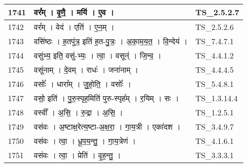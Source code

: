 \documentclass[17pt]{extarticle}
\begin{document}
\begin{longtable}{||p{0.4in}||p{4.9in}||p{0.9in}||}
    \hline
        
    1741 & वर᳚म्   ।   वृ॒णै॒   ।   मयि॑   ।   ए॒व   ।    & TS\_2.5.2.7       \\
    
    \hline
        
    1742 & वर᳚म्   ।   वेद॑   ।   एति॑   ।   ए॒न॒म्   ।    & TS\_2.5.2.6       \\
    
    \hline
        
    1743 & वसि॑ष्ठः   ।   ह॒तपु॑त्र॒ इति॑ ह॒त{-}पु॒त्रः॒   ।   अ॒का॒म॒य॒त॒   ।   वि॒न्देय॑   ।    & TS\_7.4.7.1       \\
    
    \hline
        
    1744 & वसु॑भ्य॒ इति॒ वसु॑{-}भ्यः॒   ।   त्वा॒   ।   वसून्॑   ।   जि॒न्व॒   ।    & TS\_4.4.1.2       \\
    
    \hline
        
    1745 & वसू॑नाम्   ।   दे॒वम्   ।   राधः॑   ।   जना॑नाम्   ।    & TS\_4.4.4.5       \\
    
    \hline
        
    1746 & वसोः᳚   ।   धारा᳚म्   ।   जु॒हो॒ति॒   ।   वसोः᳚   ।    & TS\_5.4.8.1       \\
    
    \hline
        
    1747 & वसो॒ इति॑   ।   पु॒रु॒स्पृह॒मिति॑ पुरु{-}स्पृह᳚म्   ।   र॒यिम्   ।   सः   ।    & TS\_1.3.14.4       \\
    
    \hline
        
    1748 & वस्वी᳚   ।   अ॒सि॒   ।   रु॒द्रा   ।   अ॒सि॒   ।    & TS\_1.2.5.1       \\
    
    \hline
        
    1749 & वस॑वः   ।   अ॒ष्टाक्ष॒रेत्य॒ष्टा{-}अ॒क्ष॒रा॒   ।   गा॒य॒त्री   ।   एका॑दश   ।    & TS\_3.4.9.7       \\
    
    \hline
        
    1750 & वस॑वः   ।   त्वा॒   ।   धू॒प॒य॒न्तु॒   ।   गा॒य॒त्रेण॑   ।    & TS\_4.1.6.1       \\
    
    \hline
        
    1751 & वस॑वः   ।   त्वा॒   ।   प्रेति॑   ।   वृ॒ह॒न्तु॒   ।    & TS\_3.3.3.1       \\
    

\end{longtable}
\end{document}
